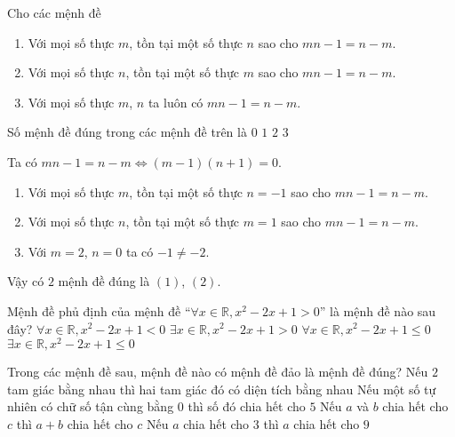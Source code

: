 \begin{ex}%
	Cho các mệnh đề
	\begin{enumerate}[(1)]
		\item Với mọi số thực $m$, tồn tại một số thực $n$ sao cho $mn-1=n-m$.
		\item Với mọi số thực $n$, tồn tại một số thực $m$ sao cho $mn-1=n-m$.
		\item Với mọi số thực $m$, $n$ ta luôn có $mn-1=n-m$.
	\end{enumerate}
	Số mệnh đề đúng trong các mệnh đề trên là
	\choice
	{$0$}
	{$1$}
	{\True $2$}
	{$3$}
	\loigiai
	{Ta có $mn-1=n-m\Leftrightarrow (m-1)(n+1)=0$.
		\begin{enumerate}[(1)]
			\item Với mọi số thực $m$, tồn tại một số thực $n=-1$ sao cho $mn-1=n-m$.
			\item Với mọi số thực $n$, tồn tại một số thực $m=1$ sao cho $mn-1=n-m$.
			\item Với $m=2$, $n=0$ ta có $-1\neq -2$.
		\end{enumerate}
		Vậy có $2$ mệnh đề đúng là $(1)$, $(2)$.
	}
\end{ex}

\begin{ex}%
	Mệnh đề phủ định của mệnh đề ``$\forall x\in \mathbb{R}, x^2-2x+1>0$'' là mệnh đề nào sau đây?
	\choice
	{$\forall x\in \mathbb{R}, x^2-2x+1<0$}
	{$\exists x\in \mathbb{R}, x^2-2x+1>0$}
	{$\forall x\in \mathbb{R}, x^2-2x+1\le 0$}
	{\True $\exists x\in \mathbb{R}, x^2-2x+1\le 0$}
\end{ex}

\begin{ex}%
	Trong các mệnh đề sau, mệnh đề nào có mệnh đề đảo là mệnh đề đúng?
	\choice
	{Nếu $2$ tam giác bằng nhau thì hai tam giác đó có diện tích bằng nhau}
	{Nếu một số tự nhiên có chữ số tận cùng bằng $ 0 $ thì số đó chia hết cho $ 5 $}
	{Nếu $a$ và $b$ chia hết cho $c$ thì $a + b$ chia hết cho $c$}
	{\True Nếu $a$ chia hết cho $ 3 $ thì $a$ chia hết cho $ 9 $}
\end{ex}   	

